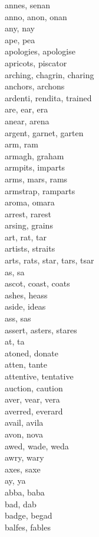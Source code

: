annes, senan\\
anno, anon, onan\\
any, nay\\
ape, pea\\
apologies, apologise\\
apricots, piscator\\
arching, chagrin, charing\\
anchors, archons\\
ardenti, rendita, trained\\
are, ear, era\\
anear, arena\\
argent, garnet, garten\\
arm, ram\\
armagh, graham\\
armpits, imparts\\
arms, mars, rams\\
armstrap, ramparts\\
aroma, omara\\
arrest, rarest\\
arsing, grains\\
art, rat, tar\\
artists, straits\\
arts, rats, star, tars, tsar\\
as, sa\\
ascot, coast, coats\\
ashes, heass\\
aside, ideas\\
ass, sas\\
assert, asters, stares\\
at, ta\\
atoned, donate\\
atten, tante\\
attentive, tentative\\
auction, caution\\
aver, vear, vera\\
averred, everard\\
avail, avila\\
avon, nova\\
awed, wade, weda\\
awry, wary\\
axes, saxe\\
ay, ya\\
abba, baba\\
bad, dab\\
badge, begad\\
balfes, fables\\
